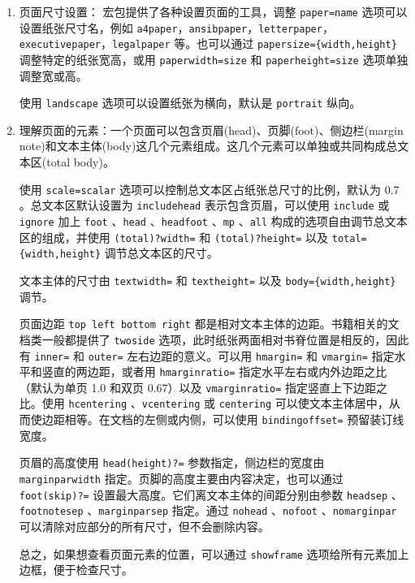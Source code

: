 \begin{enumerate}
\begin{tcolorbox}[sidebyside, colback=white, parbox=false]
\end{tcolorbox}

\item 页面尺寸设置： 宏包提供了各种设置页面的工具，调整 {\tt paper=\ttit name} 选项可以设置纸张尺寸名，例如 \verb|a4paper|，\verb|ansibpaper|，\verb|letterpaper|，\verb|executivepaper|，\verb|legalpaper| 等。也可以通过 {\tt papersize=\{{\ttit width},{\ttit height}\}} 调整特定的纸张宽高，或用 {\tt paperwidth=\ttit size} 和 {\tt paperheight=\ttit size} 选项单独调整宽或高。

使用 \verb|landscape| 选项可以设置纸张为横向，默认是 \verb|portrait| 纵向。

\item 理解页面的元素：一个页面可以包含页眉(head)、页脚(foot)、侧边栏(margin note)和文本主体(body)这几个元素组成。这几个元素可以单独或共同构成总文本区(total body)。

使用 {\tt scale=\ttit scalar} 选项可以控制总文本区占纸张总尺寸的比例，默认为 0.7 。总文本区默认设置为 \verb|includehead| 表示包含页眉，可以使用 \verb|include| 或 \verb|ignore| 加上 \verb|foot| 、\verb|head| 、\verb|headfoot| 、\verb|mp| 、\verb|all| 构成的选项自由调节总文本区的组成，并使用 \verb|(total)?width=| 和 \verb|(total)?height=| 以及 {\tt total=\{{\ttit width},{\ttit height}\}} 调节总文本区的尺寸。

文本主体的尺寸由 \verb|textwidth=| 和 \verb|textheight=| 以及 {\tt body=\{{\ttit width},{\ttit height}\}} 调节。

页面边距 \verb|top left bottom right| 都是相对文本主体的边距。书籍相关的文档类一般都提供了 \verb|twoside| 选项，此时纸张两面相对书脊位置是相反的，因此有 \verb|inner=| 和 \verb|outer=| 左右边距的意义。可以用 \verb|hmargin=| 和 \verb|vmargin=| 指定水平和竖直的两边距，或者用 \verb|hmarginratio=| 指定水平左右或内外边距之比（默认为单页 1.0 和双页 0.67）以及 \verb|vmarginratio=| 指定竖直上下边距之比。使用 \verb|hcentering| 、\verb|vcentering| 或 \verb|centering| 可以使文本主体居中，从而使边距相等。在文档的左侧或内侧，可以使用 \verb|bindingoffset=| 预留装订线宽度。

页眉的高度使用 \verb|head(height)?=| 参数指定，侧边栏的宽度由 \verb|marginparwidth| 指定。页脚的高度主要由内容决定，也可以通过 \verb|foot(skip)?=| 设置最大高度。它们离文本主体的间距分别由参数 \verb|headsep| 、\verb|footnotesep| 、\verb|marginparsep| 指定。通过 \verb|nohead| 、\verb|nofoot| 、\verb|nomarginpar| 可以清除对应部分的所有尺寸，但不会删除内容。

总之，如果想查看页面元素的位置，可以通过 \verb|showframe| 选项给所有元素加上边框，便于检查尺寸。


\end{enumerate}

